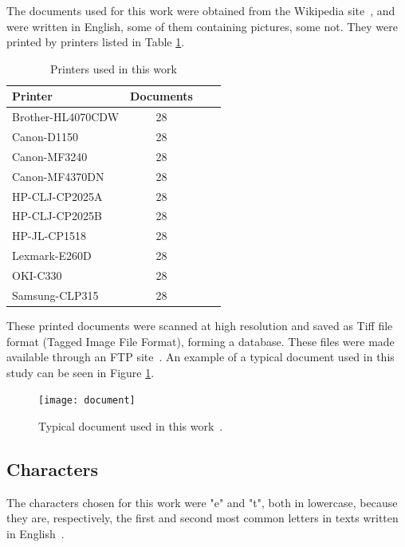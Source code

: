 \documentclass[10pt,twocolumn,letterpaper]{article}
\begin{document}
The documents used for this work were obtained from the Wikipedia site~\cite{Wikipedia}, and were written in English, some of them containing pictures, some not. They were printed by printers listed in Table \ref{tab:printers}. 

\begin{table}
\label{tab:printers}
\caption{Printers used in this work}
\begin{center}
\begin{tabular}{l*{2}{c}r}
Printer           & Documents \\
\hline
Brother-HL4070CDW & 28 \\
Canon-D1150 & 28 \\
Canon-MF3240 & 28 \\
Canon-MF4370DN & 28 \\
HP-CLJ-CP2025A & 28 \\
HP-CLJ-CP2025B & 28 \\
HP-JL-CP1518 & 28 \\
Lexmark-E260D & 28 \\
OKI-C330 & 28 \\
Samsung-CLP315 & 28 \\
\end{tabular}
\end{center}
\end{table}

These printed documents were scanned at high resolution and saved as Tiff file format (Tagged Image File Format), forming a database. These files were made available through an FTP site~\cite{Printers_dataset}. An example of a typical document used in this study can be seen in Figure \ref{fig:document}.

\begin{figure}
\begin{center}
	\texttt{[image: document]}
	\caption{Typical document used in this work~\cite{Wikipedia}.}
\label{fig:document}   
\end{center} 
\end{figure}

\subsection{Characters}
\label{subsec:characters}

The characters chosen for this work were "e" and "t", both in lowercase, because they are, respectively, the first and second most common letters in texts written in English~\cite{Letter_Frequency}.
\end{document}

